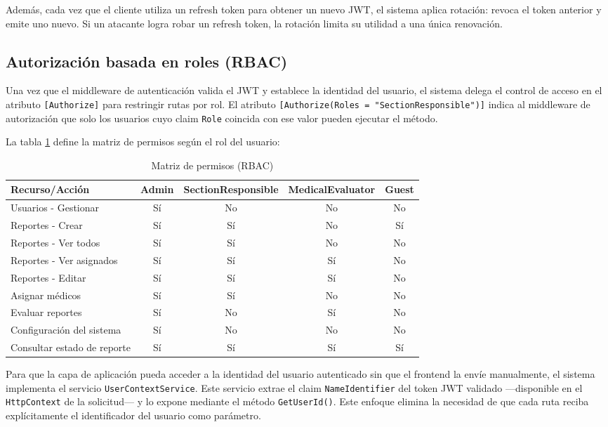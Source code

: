 \documentclass[12pt,letterpaper]{article}
\begin{document}
Además, cada vez que el cliente utiliza un refresh token para obtener un nuevo JWT, el sistema aplica rotación: revoca el token anterior y emite uno nuevo. Si un atacante logra robar un refresh token, la rotación limita su utilidad a una única renovación.

\subsection{Autorización basada en roles (RBAC)}

Una vez que el middleware de autenticación valida el JWT y establece la identidad del usuario, el sistema delega el control de acceso en el atributo \texttt{[Authorize]} para restringir rutas por rol. El atributo \texttt{[Authorize(Roles = "SectionResponsible")]} indica al middleware de autorización que solo los usuarios cuyo claim \texttt{Role} coincida con ese valor pueden ejecutar el método.

La tabla \ref{tab:rbac} define la matriz de permisos según el rol del usuario:

\begin{table}[H]
\centering
\caption{Matriz de permisos (RBAC)}
\label{tab:rbac}
\begin{tabular}{|l|c|c|c|c|}
\hline
\textbf{Recurso/Acción} & \textbf{Admin} & \textbf{SectionResponsible} & \textbf{MedicalEvaluator} & \textbf{Guest} \\ \hline
Usuarios - Gestionar & Sí & No & No & No \\ \hline
Reportes - Crear & Sí & Sí & No & Sí \\ \hline
Reportes - Ver todos & Sí & Sí & No & No \\ \hline
Reportes - Ver asignados & Sí & Sí & Sí & No \\ \hline
Reportes - Editar & Sí & Sí & Sí & No \\ \hline
Asignar médicos & Sí & Sí & No & No \\ \hline
Evaluar reportes & Sí & No & Sí & No \\ \hline
Configuración del sistema & Sí & No & No & No \\ \hline
Consultar estado de reporte & Sí & Sí & Sí & Sí \\ \hline
\end{tabular}
\end{table}

Para que la capa de aplicación pueda acceder a la identidad del usuario autenticado sin que el frontend la envíe manualmente, el sistema implementa el servicio \texttt{UserContextService}. Este servicio extrae el claim \texttt{NameIdentifier} del token JWT validado —disponible en el \texttt{HttpContext} de la solicitud— y lo expone mediante el método \texttt{GetUserId()}. Este enfoque elimina la necesidad de que cada ruta reciba explícitamente el identificador del usuario como parámetro.
\end{document}
